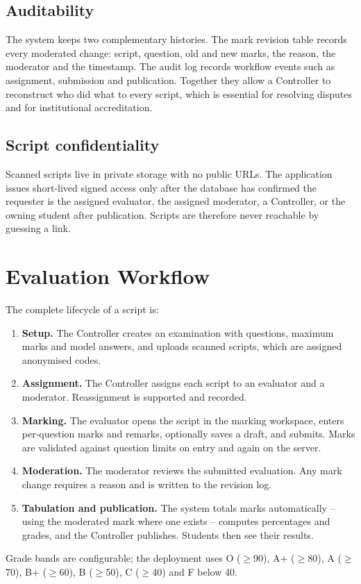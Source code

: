 \documentclass[conference]{IEEEtran}
\begin{document}
\subsection{Auditability}
The system keeps two complementary histories. The mark revision table records every moderated change: script, question, old and new marks, the reason, the moderator and the timestamp. The audit log records workflow events such as assignment, submission and publication. Together they allow a Controller to reconstruct who did what to every script, which is essential for resolving disputes and for institutional accreditation.

\subsection{Script confidentiality}
Scanned scripts live in private storage with no public URLs. The application issues short-lived signed access only after the database has confirmed the requester is the assigned evaluator, the assigned moderator, a Controller, or the owning student after publication. Scripts are therefore never reachable by guessing a link.

\section{Evaluation Workflow}
The complete lifecycle of a script is:
\begin{enumerate}
\item \textbf{Setup.} The Controller creates an examination with questions, maximum marks and model answers, and uploads scanned scripts, which are assigned anonymised codes.
\item \textbf{Assignment.} The Controller assigns each script to an evaluator and a moderator. Reassignment is supported and recorded.
\item \textbf{Marking.} The evaluator opens the script in the marking workspace, enters per-question marks and remarks, optionally saves a draft, and submits. Marks are validated against question limits on entry and again on the server.
\item \textbf{Moderation.} The moderator reviews the submitted evaluation. Any mark change requires a reason and is written to the revision log.
\item \textbf{Tabulation and publication.} The system totals marks automatically -- using the moderated mark where one exists -- computes percentages and grades, and the Controller publishes. Students then see their results.
\end{enumerate}
Grade bands are configurable; the deployment uses O ($\geq$90), A+ ($\geq$80), A ($\geq$70), B+ ($\geq$60), B ($\geq$50), C ($\geq$40) and F below 40.
\end{document}
